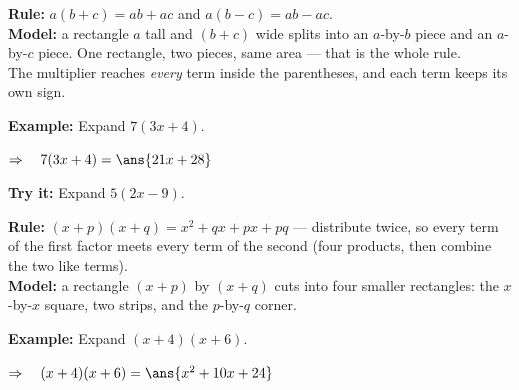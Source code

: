 \documentclass[12pt]{article}
\begin{document}


\begin{formulabox}
\textbf{Rule:} $a(b + c) = ab + ac$ \quad and \quad $a(b - c) = ab - ac$.\\[3pt]
\textbf{Model:} a rectangle $a$ tall and $(b + c)$ wide splits into an
$a$-by-$b$ piece and an $a$-by-$c$ piece. One rectangle, two pieces, same area
--- that is the whole rule.\\[3pt]
The multiplier reaches \emph{every} term inside the parentheses, and each term
keeps its own sign.
\end{formulabox}

\begin{examplebox}
\textbf{Example:} Expand $7(3x + 4)$.

$\Rightarrow\quad 7(3x + 4) = \ans{21x + 28}$
\end{examplebox}

\begin{tryitbox}
\textbf{Try it:} Expand $5(2x - 9)$.\\[2pt]
\end{tryitbox}


\begin{formulabox}
\textbf{Rule:} $(x + p)(x + q) = x^2 + qx + px + pq$ --- distribute twice, so
every term of the first factor meets every term of the second (four products,
then combine the two like terms).\\[3pt]
\textbf{Model:} a rectangle $(x + p)$ by $(x + q)$ cuts into four smaller
rectangles: the $x$-by-$x$ square, two strips, and the $p$-by-$q$ corner.
\end{formulabox}

\begin{examplebox}
\textbf{Example:} Expand $(x + 4)(x + 6)$.

$\Rightarrow\quad (x + 4)(x + 6) = \ans{x^2 + 10x + 24}$
\end{examplebox}
\end{document}
